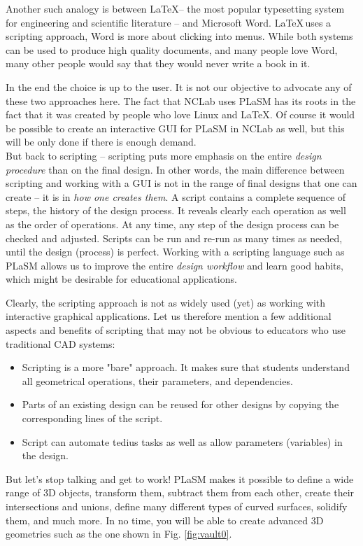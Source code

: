 Another such analogy is between \LaTeX -- the most popular typesetting system for engineering 
and scientific literature -- and Microsoft Word. \LaTeX \,uses a scripting approach, Word is more
about clicking into menus. While both systems can be used to produce high quality documents, 
and many people love Word, many other people would say that they would never write a book in it. 

In the end the choice is up to the user. It is not our objective to advocate any
of these two approaches here. The fact that NCLab uses PLaSM has its roots in
the fact that it was created by people who love Linux and \LaTeX. Of course it would be possible 
to create an interactive GUI for PLaSM in NCLab as well, but this will be only done if there 
is enough demand.\\

\noindent
But back to scripting -- scripting puts more emphasis on the entire {\em design procedure}
than on the final design. In other words, the main difference between 
scripting and working with a GUI is not in the range of final designs that one can create 
-- it is in {\em how one creates them}. A script contains 
a complete sequence of steps, the history of the design process. It reveals clearly each 
operation as well as the order of operations. At any time, any step 
of the design process can be checked and adjusted. Scripts can be run and 
re-run as many times as needed, until the design (process) is perfect. 
Working with a scripting language such as PLaSM allows us to improve the entire  
{\em design workflow} and learn good habits, which might be desirable for
educational applications.

Clearly, the scripting approach is not as widely used (yet) as working with 
interactive graphical applications. Let us therefore mention a few 
additional aspects and benefits of scripting that may not be obvious 
to educators who use traditional CAD systems:


\begin{itemize}

\item Scripting is a more "bare" approach. It makes sure that students understand
      all geometrical operations, their parameters, and dependencies.
\item Parts of an existing design can be reused for other designs by copying the 
      corresponding lines of the script. 
\item Script can automate tedius tasks as well as allow parameters (variables)
      in the design. 
\end{itemize}
But let's stop talking and get to work! PLaSM makes it possible to define a wide range of 3D 
objects, transform them, subtract them from each other, create their intersections
and unions, define many different types of curved surfaces, solidify them, and 
much more. In no time, you will be able to create advanced 3D geometries such 
as the one shown in Fig. \ref{fig:vault0}.
\newpage

